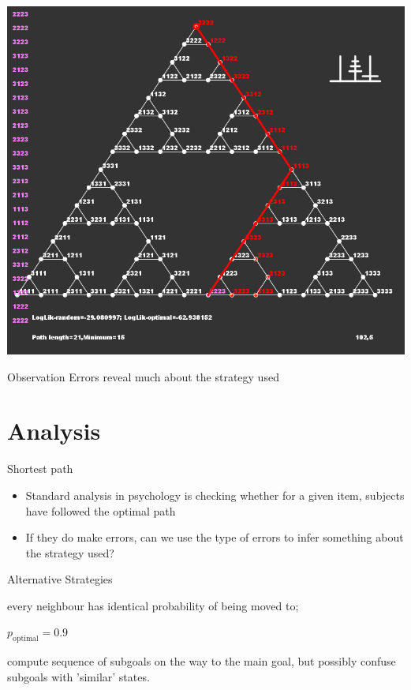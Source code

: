 \documentclass[xcolor=table]{beamer}
\begin{document}
\begin{frame}%
\centerline{
 \includegraphics[height=.9\textheight]{toh.png}}
\end{frame}

\begin{frame}{Observation}
  Errors reveal much about the strategy used
\end{frame}

\section{Analysis}
\label{sec:analysis}

\begin{frame}{Shortest path}
  \begin{itemize}
  \item Standard analysis in psychology is checking whether for a given item, subjects have followed the optimal path
  \item If they do make errors, can we use the type of errors to infer something about the strategy used?
  \end{itemize}
\end{frame}

\begin{frame}{Alternative Strategies}
  \begin{description}[<+->]
  \item[Random walk:] every neighbour has identical probability of being moved to;
  \item[Optimal path (with 'performance' noise):] $p_{\mbox{optimal}}=0.9$
  \item[Subgoal-confusion:] compute sequence of subgoals on the way to the main goal, but possibly confuse subgoals with 'similar' states.
  \end{description}
\end{frame}
\end{document}
